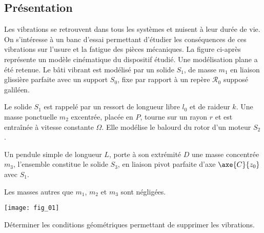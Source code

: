 \def\columnseprulecolor{\color{ocre}}
\setlength{\columnseprule}{0.4pt} 


\setcounter{exo}{0}



\ifprof
\else
\begin{multicols}{2}


\subsection*{Présentation}
Les vibrations se retrouvent dans tous les systèmes et nuisent à leur durée de vie. On s’intéresse à un banc d’essai permettant d’étudier les conséquences de ces vibrations sur l’usure et la fatigue des pièces mécaniques.
La figure ci-après représente un modèle cinématique du dispositif étudié. Une modélisation plane a été retenue.
Le bâti vibrant est modélisé par un solide $S_1$, de masse $m_1$ en liaison glissière parfaite avec un support $S_0$, fixe par rapport à un repère $\mathcal{R}_0$ supposé galiléen.

Le solide $S_1$ est rappelé par un ressort de longueur libre $l_0$ et de raideur $k$.
Une masse ponctuelle $m_2$ excentrée, placée en $P$, tourne sur un rayon $r$ et est entraînée à vitesse constante $\Omega$. Elle modélise le 
balourd du rotor d’un moteur $S_2$.

Un pendule simple de longueur $L$, porte à son extrémité $D$ une masse concentrée $m_3$, l’ensemble constitue le solide $S_3$, en liaison pivot parfaite d’axe $\axe{C}{z_0}$ avec $S_1$.

Les masses autres que $m_1$, $m_2$ et $m_3$ sont négligées.



\begin{center}
\texttt{[image: fig\_01]}
\end{center}

\begin{obj}
Déterminer les conditions géométriques permettant de supprimer les vibrations.
\end{obj}

\ifprof
\begin{corrige}
\end{corrige}
\else
\fi


\ifprof
\begin{corrige}
\end{corrige}
\else
\fi



\end{multicols}
